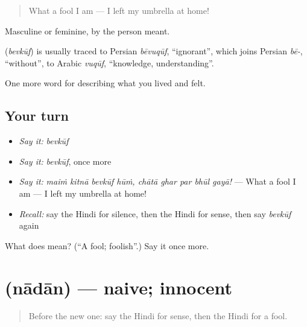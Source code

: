\begin{quote}
What a fool I am — I left my umbrella at home!
\end{quote}

Masculine or feminine, by the person meant.

\begin{cousinweb}
\textbf{} (\emph{bevkūf}) is usually traced to Persian \emph{bēvuqūf}, \textquotedblleft{}ignorant\textquotedblright{}, which joins Persian \emph{bē-}, \textquotedblleft{}without\textquotedblright{}, to Arabic \emph{vuqūf}, \textquotedblleft{}knowledge, understanding\textquotedblright{}.
\end{cousinweb}

\begin{grammarlens}[title={What you've built}]
One more word for describing what you lived and felt.
\end{grammarlens}

\subsection*{Your turn}
\begin{itemize}
\raggedright
  \item \emph{Say it:} \emph{bevkūf}
  \item \emph{Say it:} \emph{bevkūf}, once more
  \item \emph{Say it:} \emph{maiṁ kitnā bevkūf hūṁ, chātā ghar par bhūl gayā!} — What a fool I am — I left my umbrella at home!
  \item \emph{Recall:} say the Hindi for silence, then the Hindi for sense, then say \emph{bevkūf} again
\end{itemize}

\begin{tcolorbox}[breakable,colback=teal!4,colframe=teal!35!black,title={Before you move on}]
What does  mean? (\textquotedblleft{}A fool; foolish\textquotedblright{}.) Say it once more.
\end{tcolorbox}
\section[\texorpdfstring{\hi{नादान} (nādān)}{नादान (nādān)}]{ (nādān) — naive; innocent}

\label{lesson:HI-C474-nadan}



\begin{quote}
Before the new one: say the Hindi for sense, then the Hindi for a fool.
\end{quote}

